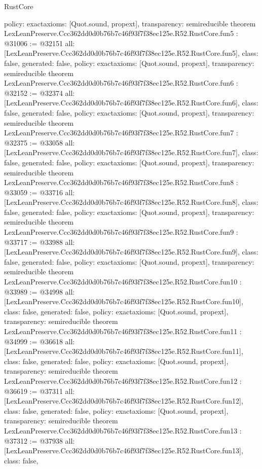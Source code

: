 \begin{lexlean}{RustCore}
\begin{coremodule}
{  policy: exact{axioms: [Quot.sound, propext]},
  transparency: semireducible
}
theorem LexLeanPreserve.Ccc362dd0d0b76b7c46f93f7f38ec125e.R52.RustCore.fun5 : @31006 := @32151 {
  all: [LexLeanPreserve.Ccc362dd0d0b76b7c46f93f7f38ec125e.R52.RustCore.fun5],
  class: false,
  generated: false,
  policy: exact{axioms: [Quot.sound, propext]},
  transparency: semireducible
}
theorem LexLeanPreserve.Ccc362dd0d0b76b7c46f93f7f38ec125e.R52.RustCore.fun6 : @32152 := @32374 {
  all: [LexLeanPreserve.Ccc362dd0d0b76b7c46f93f7f38ec125e.R52.RustCore.fun6],
  class: false,
  generated: false,
  policy: exact{axioms: [Quot.sound, propext]},
  transparency: semireducible
}
theorem LexLeanPreserve.Ccc362dd0d0b76b7c46f93f7f38ec125e.R52.RustCore.fun7 : @32375 := @33058 {
  all: [LexLeanPreserve.Ccc362dd0d0b76b7c46f93f7f38ec125e.R52.RustCore.fun7],
  class: false,
  generated: false,
  policy: exact{axioms: [Quot.sound, propext]},
  transparency: semireducible
}
theorem LexLeanPreserve.Ccc362dd0d0b76b7c46f93f7f38ec125e.R52.RustCore.fun8 : @33059 := @33716 {
  all: [LexLeanPreserve.Ccc362dd0d0b76b7c46f93f7f38ec125e.R52.RustCore.fun8],
  class: false,
  generated: false,
  policy: exact{axioms: [Quot.sound, propext]},
  transparency: semireducible
}
theorem LexLeanPreserve.Ccc362dd0d0b76b7c46f93f7f38ec125e.R52.RustCore.fun9 : @33717 := @33988 {
  all: [LexLeanPreserve.Ccc362dd0d0b76b7c46f93f7f38ec125e.R52.RustCore.fun9],
  class: false,
  generated: false,
  policy: exact{axioms: [Quot.sound, propext]},
  transparency: semireducible
}
theorem LexLeanPreserve.Ccc362dd0d0b76b7c46f93f7f38ec125e.R52.RustCore.fun10 : @33989 := @34998 {
  all: [LexLeanPreserve.Ccc362dd0d0b76b7c46f93f7f38ec125e.R52.RustCore.fun10],
  class: false,
  generated: false,
  policy: exact{axioms: [Quot.sound, propext]},
  transparency: semireducible
}
theorem LexLeanPreserve.Ccc362dd0d0b76b7c46f93f7f38ec125e.R52.RustCore.fun11 : @34999 := @36618 {
  all: [LexLeanPreserve.Ccc362dd0d0b76b7c46f93f7f38ec125e.R52.RustCore.fun11],
  class: false,
  generated: false,
  policy: exact{axioms: [Quot.sound, propext]},
  transparency: semireducible
}
theorem LexLeanPreserve.Ccc362dd0d0b76b7c46f93f7f38ec125e.R52.RustCore.fun12 : @36619 := @37311 {
  all: [LexLeanPreserve.Ccc362dd0d0b76b7c46f93f7f38ec125e.R52.RustCore.fun12],
  class: false,
  generated: false,
  policy: exact{axioms: [Quot.sound, propext]},
  transparency: semireducible
}
theorem LexLeanPreserve.Ccc362dd0d0b76b7c46f93f7f38ec125e.R52.RustCore.fun13 : @37312 := @37938 {
  all: [LexLeanPreserve.Ccc362dd0d0b76b7c46f93f7f38ec125e.R52.RustCore.fun13],
  class: false,
}
\end{coremodule}
\end{lexlean}
